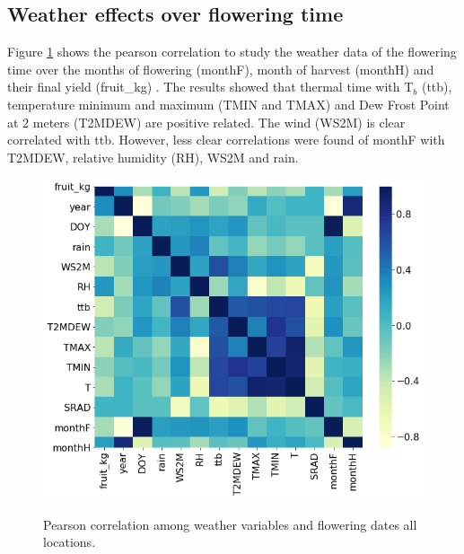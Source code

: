 \documentclass[gene,journal,article,submit,moreauthors,pdftex]{Definitions/mdpi}
\begin{document}
\subsection{Weather effects over flowering time }

Figure \ref{fig:heat} shows the pearson correlation to study the weather data of the flowering time over the months of flowering  (monthF), month of harvest (monthH) and their final yield (fruit\_kg) . The results showed that thermal time with T$_{b}$ (ttb), temperature minimum and maximum (TMIN and TMAX) and Dew Frost Point at 2 meters (T2MDEW) are positive related. The wind (WS2M) is clear correlated with ttb. However, less clear correlations were found of monthF  with T2MDEW, relative humidity (RH), WS2M and rain.  

\begin{figure}[h!]
	\centering
	\includegraphics[scale=0.35]{images/heatm.png}\\
	\caption{\footnotesize {Pearson correlation among weather variables and flowering dates all locations. \\}}
	\label{fig:heat} 
\end{figure}
\end{document}
